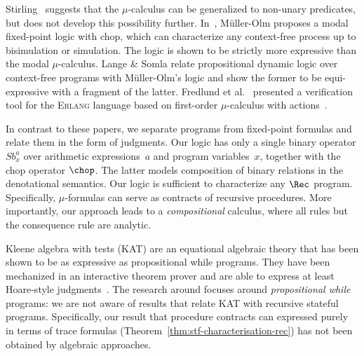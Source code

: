 \documentclass[a4paper,numberwithinsect]{lipics-v2021}
\begin{document}
Stirling~\cite[p.~528, footnote~2]{sti-93-handbook-chapter} suggests
that the $\mu$-calculus can be generalized to non-unary predicates,
but does not develop this possibility further. 
%
In~\cite{olm-99}, Müller-Olm proposes a modal fixed-point logic with chop,
which can characterize any context-free process up to bisimulation or 
simulation. The logic is shown to be strictly more expressive than the 
modal $\mu$-calculus.
%
Lange \& Somla \cite{LangeSomla06} relate propositional dynamic logic
over context-free programs with Müller-Olm's logic and show the former
to be equi-expressive with a fragment of the latter.
%
Fredlund et al.~\cite{ACDFGN03} presented a verification tool for the
\textsc{Erlang} language based on first-order $\mu$-calculus with
actions~\cite{DamGurov02}.

In contrast to these papers, we separate programs from fixed-point
formulas and relate them in the form of judgments. Our logic has only
a single binary operator $\mathit{Sb}_x^{a}$ over arithmetic
expressions~$a$ and program variables~$x$, together with the chop
operator $\chop$.  The latter models composition of binary relations
in the denotational semantics. Our logic is sufficient to characterize
any $\Rec$ program. Specifically, $\mu$-formulas can serve as
contracts of recursive procedures.  More importantly, our approach
leads to a \emph{compositional} calculus, where all rules but the
consequence rule are analytic.

Kleene algebra with tests (KAT) \cite{Kozen97} are an equational
algebraic theory that has been shown to be as expressive as
propositional while programs. They have been mechanized in an
interactive theorem prover \cite{Pous13} and are able to express at
least Hoare-style judgments~\cite{Kozen00}. The research around
focuses around \emph{propositional while} programs: we are not aware
of results that relate KAT with recursive stateful
programs. Specifically, our result that procedure contracts can
expressed purely in terms of trace formulas
(Theorem~\ref{thm:stf-characterisation-rec}) has not been obtained by
algebraic approaches.
\end{document}
